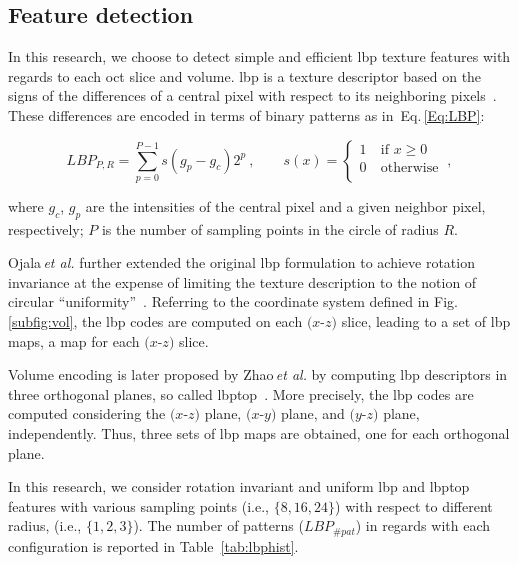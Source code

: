 
\subsection{Feature detection}\label{subsec:feaext}
In this research, we choose to detect simple and efficient \ac{lbp} texture features with regards to each \ac{oct} slice and volume.
\ac{lbp} is a texture descriptor based on the signs of the differences of a central pixel with respect to its neighboring pixels~\cite{ojala2002multiresolution}.
These differences are encoded in terms of binary patterns as in~Eq.\,\eqref{Eq:LBP}:

\begin{equation}\label{Eq:LBP}
LBP_{P,R} = \sum_{p=0}^{P-1}s(g_{p} - g_{c})2^{p} \ , \qquad s(x) = \begin{cases}
    1  & \ \text{if } x \geq 0\\
    0  & \ \text{otherwise}\\
  \end{cases} \ ,
\end{equation}

\noindent where $g_c$, $g_{p}$ are the intensities of the central pixel and a given neighbor pixel, respectively; $P$ is the number of sampling points in the circle of radius $R$.

Ojala\,\textit{et al.} further extended the original \ac{lbp} formulation to achieve rotation invariance at the expense of limiting the texture description to the notion of circular ``uniformity''~\cite{ojala2002multiresolution}.
Referring to the coordinate system defined in Fig.\,\ref{subfig:vol}, the \ac{lbp} codes are computed on each $(x$-$z)$ slice, leading to a set of \ac{lbp} maps, a map for each $(x$-$z)$ slice.

Volume encoding is later proposed by Zhao\,\textit{et al.} by computing \ac{lbp} descriptors in three orthogonal planes, so called \ac{lbptop}~\cite{zhao2012rotation}.
More precisely, the \ac{lbp} codes are computed considering the $(x$-$z)$ plane, $(x$-$y)$ plane, and $(y$-$z)$ plane, independently.
Thus, three sets of \ac{lbp} maps are obtained, one for each orthogonal plane.

In this research, we consider rotation invariant and uniform \ac{lbp} and \ac{lbptop} features with various sampling points (i.e., $\{8,16,24\}$) with respect to different radius, (i.e., $\{1,2,3\}$).
The number of patterns ($LBP_{\#pat}$) in regards with each configuration is reported in Table~\ref{tab:lbphist}.

